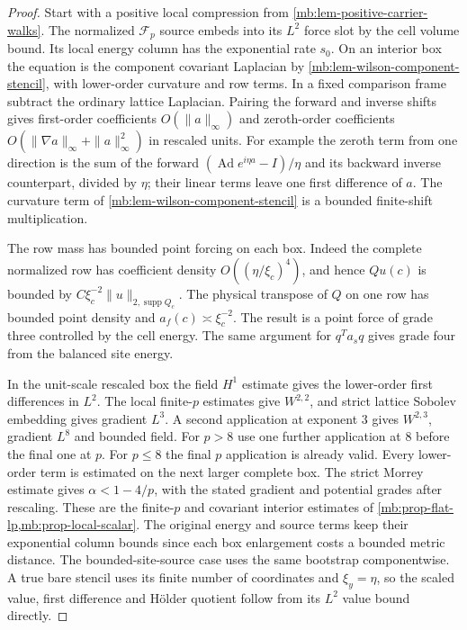 \documentclass[11pt,letterpaper,reqno]{amsart}
\numberwithin{equation}{section}
\theoremstyle{definition}
\theoremstyle{remark}
\begin{document}
\begin{proof}
Start with a positive local compression from \cref{mb:lem-positive-carrier-walks}. The normalized \(\mathcal F_p\) source embeds into its \(L^2\) force slot by the cell volume bound. Its local energy column has the exponential rate \(s_0\). On an interior box the equation is the component covariant Laplacian by \cref{mb:lem-wilson-component-stencil}, with lower-order curvature and row terms. In a fixed comparison frame subtract the ordinary lattice Laplacian. Pairing the forward and inverse shifts gives first-order coefficients \(O(\|a\|_\infty)\) and zeroth-order coefficients \(O(\|\nabla a\|_\infty+\|a\|_\infty^2)\) in rescaled units. For example the zeroth term from one direction is the sum of the forward \((\operatorname{Ad}e^{i\eta a}-I)/\eta\) and its backward inverse counterpart, divided by \(\eta\); their linear terms leave one first difference of \(a\). The curvature term of \cref{mb:lem-wilson-component-stencil} is a bounded finite-shift multiplication.

The row mass has bounded point forcing on each box. Indeed the complete normalized row has coefficient density \(O((\eta/\xi_c)^4)\), and hence \(Qu(c)\) is bounded by \(C\xi_c^{-2}\|u\|_{2,\operatorname{supp} Q_c}\). The physical transpose of \(Q\) on one row has bounded point density and \(a_f(c)\asymp\xi_c^{-2}\). The result is a point force of grade three controlled by the cell energy. The same argument for \(q^Ta_sq\) gives grade four from the balanced site energy.

In the unit-scale rescaled box the field \(H^1\) estimate gives the lower-order first differences in \(L^2\). The local finite-\(p\) estimates give \(W^{2,2}\), and strict lattice Sobolev embedding gives gradient \(L^3\). A second application at exponent \(3\) gives \(W^{2,3}\), gradient \(L^8\) and bounded field. For \(p>8\) use one further application at \(8\) before the final one at \(p\). For \(p\le8\) the final \(p\) application is already valid. Every lower-order term is estimated on the next larger complete box. The strict Morrey estimate gives \(\alpha<1-4/p\), with the stated gradient and potential grades after rescaling. These are the finite-\(p\) and covariant interior estimates of \cref{mb:prop-flat-lp,mb:prop-local-scalar}. The original energy and source terms keep their exponential column bounds since each box enlargement costs a bounded metric distance. The bounded-site-source case uses the same bootstrap componentwise. A true bare stencil uses its finite number of coordinates and \(\xi_y=\eta\), so the scaled value, first difference and H\"older quotient follow from its \(L^2\) value bound directly.


\end{proof}
\end{document}
